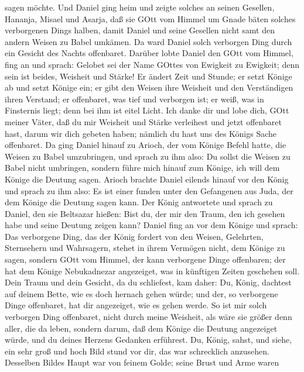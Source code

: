 sagen möchte.  Und Daniel ging heim und zeigte solches an
seinen Gesellen, Hananja, Misael und Asarja,  daß sie GOtt
vom Himmel um Gnade bäten solches verborgenen Dings halben, damit Daniel
und seine Gesellen nicht samt den andern Weisen zu Babel umkämen.
 Da ward Daniel solch verborgen Ding durch ein Gesicht des
Nachts offenbaret.  Darüber lobte Daniel den GOtt vom
Himmel, fing an und sprach: Gelobet sei der Name GOttes von Ewigkeit zu
Ewigkeit; denn sein ist beides, Weisheit und Stärke!  Er
ändert Zeit und Stunde; er setzt Könige ab und setzt Könige ein; er gibt
den Weisen ihre Weisheit und den Verständigen ihren Verstand;
 er offenbaret, was tief und verborgen ist; er weiß, was in
Finsternis liegt; denn bei ihm ist eitel Licht.  Ich danke
dir und lobe dich, GOtt meiner Väter, daß du mir Weisheit und Stärke
verleihest und jetzt offenbaret hast, darum wir dich gebeten haben;
nämlich du hast uns des Königs Sache offenbaret.  Da ging
Daniel hinauf zu Arioch, der vom Könige Befehl hatte, die Weisen zu
Babel umzubringen, und sprach zu ihm also: Du sollst die Weisen zu Babel
nicht umbringen, sondern führe mich hinauf zum Könige, ich will dem
Könige die Deutung sagen.  Arioch brachte Daniel eilends
hinauf vor den König und sprach zu ihm also: Es ist einer funden unter
den Gefangenen aus Juda, der dem Könige die Deutung sagen kann.
 Der König antwortete und sprach zu Daniel, den sie
Beltsazar hießen: Bist du, der mir den Traum, den ich gesehen habe und
seine Deutung zeigen kann?  Daniel fing an vor dem Könige
und sprach: Das verborgene Ding, das der König fordert von den Weisen,
Gelehrten, Sternsehern und Wahrsagern, stehet in ihrem Vermögen nicht,
dem Könige zu sagen,  sondern GOtt vom Himmel, der kann
verborgene Dinge offenbaren; der hat dem Könige Nebukadnezar angezeiget,
was in künftigen Zeiten geschehen soll.  Dein Traum und
dein Gesicht, da du schliefest, kam daher: Du, König, dachtest auf
deinem Bette, wie es doch hernach gehen würde; und der, so verborgene
Dinge offenbaret, hat dir angezeiget, wie es gehen werde. 
So ist mir solch verborgen Ding offenbaret, nicht durch meine Weisheit,
als wäre sie größer denn aller, die da leben, sondern darum, daß dem
Könige die Deutung angezeiget würde, und du deines Herzens Gedanken
erführest.  Du, König, sahst, und siehe, ein sehr groß und
hoch Bild stund vor dir, das war schrecklich anzusehen. 
Desselben Bildes Haupt war von feinem Golde; seine Brust und Arme waren

